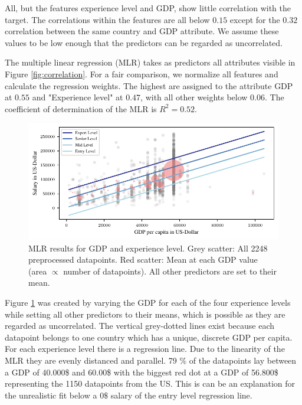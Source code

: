 \documentclass{article}
\begin{document}
All, but the features experience level and GDP, show little correlation with the target. The correlations within the features are all below $0.15$ except for the $0.32$ correlation between the same country and GDP attribute. We assume these values to be low enough that the predictors can be regarded as uncorrelated.

The multiple linear regression (MLR) takes as predictors all attributes visible in Figure \ref{fig:correlation}. For a fair comparison, we normalize all features and calculate the regression weights. The highest are assigned to the attribute GDP at $0.55$ and "Experience level" at $0.47$, with all other weights below $0.06$. The coefficient of determination of the MLR is $R^2=0.52$.

\begin{figure}[h]
    \hspace*{-.2cm}
    \centering
    \includegraphics{regression.pdf}
    \caption{MLR results for GDP and experience level. Grey scatter: All 2248 preprocessed datapoints. Red scatter: Mean at each GDP value (area $\propto$ number of datapoints). All other predictors are set to their mean.}
    \label{fig:regression}
\end{figure}


Figure \ref{fig:regression} was created by varying the GDP for each of the four experience levels while setting all other predictors to their means, which is possible as they are regarded as uncorrelated. The vertical grey-dotted lines exist because each datapoint belongs to one country which has a unique, discrete GDP per capita. For each experience level there is a regression line. Due to the linearity of the MLR they are evenly distanced and parallel. 79 \% of the datapoints lay between a GDP of 40.000\$ and 60.00\$ with the biggest red dot at a GDP of 56.800\$ representing the 1150 datapoints from the US. This is can be an explanation for the unrealistic fit below a $0\$$ salary of the entry level regression line. 
\end{document}
